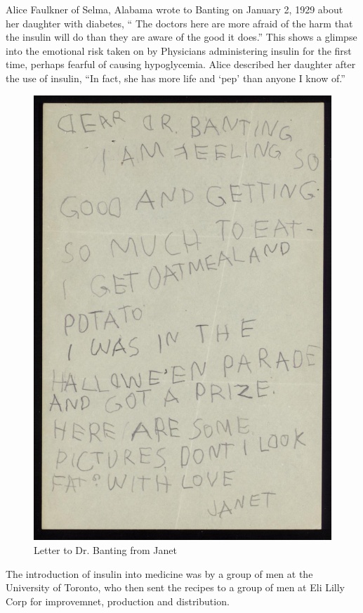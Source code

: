 \documentclass[12pt]{article}
\begin{document}
Alice Faulkner of Selma, Alabama wrote to Banting on January 2, 1929 about her daughter with diabetes, `` The doctors here are more afraid of the harm that the insulin will do than they are aware of the good it does.'' This shows a glimpse into the emotional risk taken on by Physicians administering insulin for the first time, perhaps fearful of causing hypoglycemia. Alice described her daughter after the use of insulin, ``In fact, she has more life and `pep' than anyone I know of.'' 


\begin{figure}[H]
\centering
  \includegraphics [width=5.5in]{banting_fat}
  \caption{Letter to Dr. Banting from Janet}
  \label{fig:Letter from Janet}
\end{figure}


The introduction of insulin into medicine was by a group of men at the University of Toronto, who then sent the recipes to a group of men at Eli Lilly Corp for improvemnet, production and distribution. 


\newpage
\singlespacing


\end{document}
